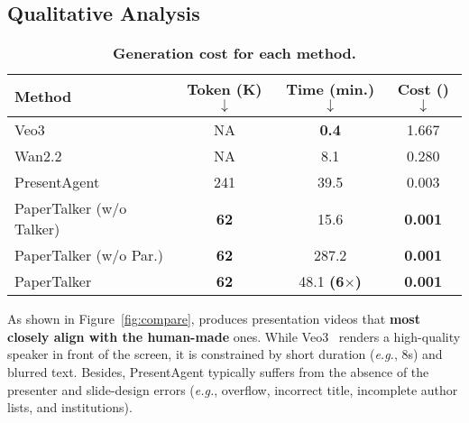 \subsection{Qualitative Analysis}
\vspace{-0.4\baselineskip} 
\begin{wraptable}[6]{r}{0.55\textwidth}
  \vspace{-1.8\baselineskip} 
  \centering
  \tablesize
  \caption{\textbf{Generation cost for each method.}}
  {
  \setlength{\tabcolsep}{3pt}
  \begin{tabular}{lccc}
    \toprule
    Method & Token (K) $\downarrow$ & Time (min.)$\downarrow$ & Cost (\text{\$})$\downarrow$ \\
    \midrule
    Veo3~\cite{deepmind2025veo3} & NA & \textbf{0.4} & 1.667 \\
    Wan2.2~\cite{wan} & NA & 8.1 & 0.280 \\
    \hline
    PresentAgent~\cite{shi2025presentagent} & 241 & 39.5 & 0.003  \\
    PaperTalker (w/o Talker) &  \textbf{62} & 15.6 & \textbf{0.001}\\    
    PaperTalker (w/o Par.) & \textbf{62} & 287.2 & \textbf{0.001}\\
    PaperTalker & \textbf{62} & 48.1 \textbf{(6$\times$)} & \textbf{0.001} \\
    \bottomrule
  \end{tabular}
  }
  \label{table:cost}
  \vspace{-2\baselineskip} 
\end{wraptable}
As shown in Figure~\ref{fig:compare}, {\agent} produces presentation videos that \textbf{most closely align with the human-made} ones. While Veo3~\cite{deepmind2025veo3} renders a high-quality speaker in front of the screen, it is constrained by short duration (\textit{e.g.}, 8s) and blurred text. Besides, PresentAgent\cite{shi2025presentagent} typically suffers from the absence of the presenter and slide-design errors (\textit{e.g.}, overflow, incorrect title, incomplete author lists, and institutions).











\vspace{-0.4\baselineskip} 
